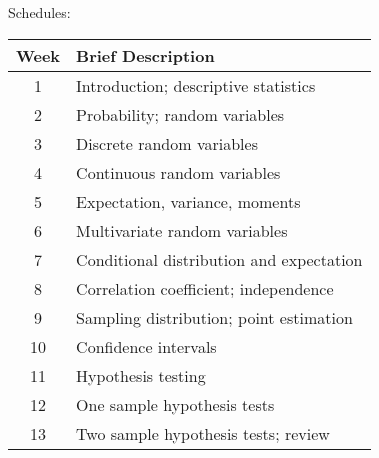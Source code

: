 \documentclass[UTF8,a4paper,10pt,openany]{book}
\theoremstyle{plain}
\theoremstyle{definition}
\begin{document}
Schedules:

\begin{center}
\begin{tabular}{cl}
\hline\hline
Week & Brief Description \\
\hline
1 & Introduction; descriptive statistics \\
2 & Probability; random variables \\
3 & Discrete random variables \\
4 & Continuous random variables \\
5 & Expectation, variance, moments \\
6 & Multivariate random variables \\
7 & Conditional distribution and expectation \\
8 & Correlation coefficient; independence \\
9 & Sampling distribution; point estimation \\
10 & Confidence intervals  \\
11 & Hypothesis testing \\
12 & One sample hypothesis tests \\
13 & Two sample hypothesis tests; review \\
\hline\hline
\end{tabular}
\end{center}


\tableofcontents
\listoffigures


\mainmatter










\end{document}

